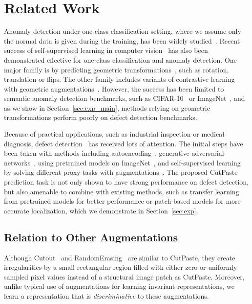 \documentclass[final]{cvpr}
\begin{document}
\section{Related Work}
\label{sec:related}
Anomaly detection under one-class classification setting, where we assume only the normal data is given during the training, has been widely studied~\cite{scholkopf2000support,tax2004support,ruff2018deep,zhai2016deep,zong2018deep,choi2018waic,ren2019likelihood,morningstar2020density,kirichenko2020normalizing}. 
Recent success of self-supervised learning in computer vision~\cite{noroozi2016unsupervised,gidaris2018unsupervised,caron2018deep,ye2019unsupervised,oord2018representation,chen2020simple,he2020momentum} has also been demonstrated effective for one-class classification and anomaly detection. One major family is by predicting geometric transformations~\cite{golan2018deep,hendrycks2019using,bergman2020classification}, such as rotation, translation or flips. The other family includes variants of contrastive learning with geometric augmentations~\cite{tack2020csi,sohn2020learning}. 
However, the success has been limited to semantic anomaly detection benchmarks, such as CIFAR-10~\cite{krizhevsky2009learning} or ImageNet~\cite{deng2009imagenet}, and as we show in Section~\ref{sec:exp_main}, methods relying on geometric transformations perform poorly on defect detection benchmarks.

Because of practical applications, such as industrial inspection or medical diagnosis, defect detection~\cite{carrera2015detecting,bergmann2019mvtec} has received lots of attention. 
The initial steps have been taken with methods including autoencoding~\cite{carrera2015detecting,bergmann2018improving,huang2019inverse,venkataramanan2019attention}, generative adversarial networks~\cite{schlegl2017unsupervised,akcay2018ganomaly}, using pretrained models on ImageNet~\cite{napoletano2018anomaly,ruff2020unifying,bergmann2020uninformed,cohen2020sub,rippel2020modeling,rudolph2020same}, and self-supervised learning by solving different proxy tasks with augmentations~\cite{yi2020patch,salehi2020puzzle,tayeh2020distance,collin2020improved}.
The proposed CutPaste prediction task is not only shown to have strong performance on defect detection, but also amenable to combine with existing methods, such as transfer learning from pretrained models for better performance or patch-based models for more accurate localization, which we demonstrate in Section~\ref{sec:exp}.

\subsection{Relation to Other Augmentations}
\label{sec:method_relation}
Although Cutout~\cite{devries2017improved} and RandomErasing~\cite{zhong2020random} are similar to CutPaste, 
they create irregularities by a small rectangular region filled with either zero or uniformly sampled pixel values instead of a structural image patch as CutPaste. 
Moreover, unlike typical use of augmentations for learning invariant representations, we learn a representation that is \emph{discriminative} to these augmentations.
\end{document}
